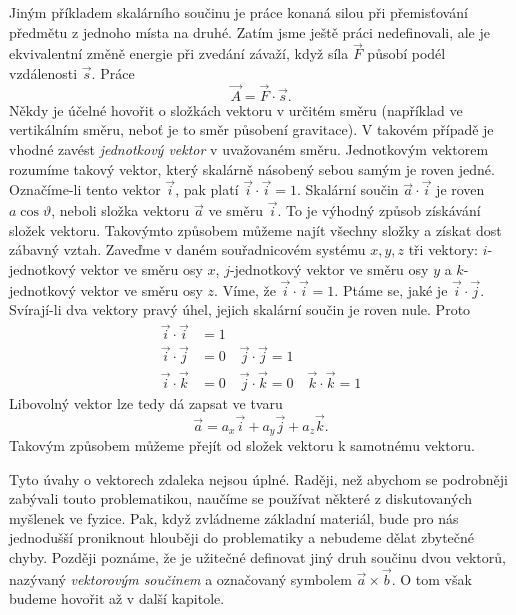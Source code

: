     Jiným příkladem skalárního součinu je práce konaná silou při přemisťování předmětu z jednoho 
    místa na druhé. Zatím jsme ještě práci nedefinovali, ale je ekvivalentní změně energie při 
    zvedání závaží, když síla \(\vec{F}\) působí podél vzdálenosti \(\vec{s}\). Práce
    \begin{equation}\label{fyz:eq166}
      \vec{A} = \vec{F}\cdot\vec{s}.
    \end{equation}
    Někdy je účelné hovořit o složkách vektoru v určitém směru (například ve vertikálním směru, 
    neboť je to směr působení gravitace). V takovém případě je vhodné zavést \emph{jednotkový 
    vektor} v uvažovaném směru. Jednotkovým vektorem rozumíme takový vektor, který skalárně 
    násobený sebou samým je roven jedné. Označíme-li tento vektor \(\vec{i}\), pak platí 
    \(\vec{i}\cdot\vec{i} = 1\). Skalární součin \(\vec{a}\cdot\vec{i}\) je roven 
    \(a\cos\vartheta\), neboli složka vektoru \(\vec{a}\) ve směru \(\vec{i}\). To je výhodný 
    způsob získávání složek vektoru. Takovýmto způsobem můžeme najít všechny složky a získat dost 
    zábavný vztah. Zaveďme v daném souřadnicovém systému \(x, y, z\) tři vektory: 
    \(i\)-jednotkový vektor ve směru osy \(x\), \(j\)-jednotkový vektor ve směru osy \(y\) a 
    \(k\)-jednotkový vektor ve směru osy \(z\). Víme, že \(\vec{i}\cdot\vec{i} = 1\). Ptáme se, 
    jaké je \(\vec{i}\cdot\vec{j}\). Svírají-li dva vektory pravý úhel, jejich skalární součin je 
    roven nule. Proto
    \begin{align}
      \vec{i}\cdot\vec{i} &= 1                                      \nonumber    \\
      \vec{i}\cdot\vec{j} &= 0 \quad \vec{j}\cdot\vec{j} = 1       \label{fyz:eq167} \\
      \vec{i}\cdot\vec{k} &= 0 \quad \vec{j}\cdot\vec{k} = 0 
                               \quad \vec{k}\cdot\vec{k} = 1       \nonumber
    \end{align}
    Libovolný vektor lze tedy dá zapsat ve tvaru
    \begin{equation}\label{fyz:eq168}
      \vec{a} = a_x\vec{i} + a_y\vec{j} + a_z\vec{k}.
    \end{equation}
    Takovým způsobem můžeme přejít od složek vektoru k samotnému vektoru.
    
    Tyto úvahy o vektorech zdaleka nejsou úplné. Raději, než abychom se podrobněji zabývali touto
    problematikou, naučíme se používat některé z diskutovaných myšlenek ve fyzice. Pak, když 
    zvládneme základní materiál, bude pro nás jednodušší proniknout hlouběji do problematiky a 
    nebudeme dělat zbytečné chyby. Později poznáme, že je užitečné definovat jiný druh součinu dvou 
    vektorů, nazývaný \emph{vektorovým součinem} a označovaný symbolem \(\vec{a}\times\vec{b}\). O 
    tom však budeme hovořit až v další kapitole.
  
